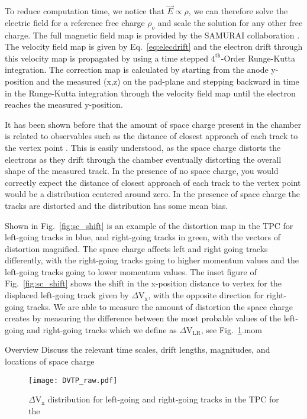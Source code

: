  To reduce computation time, we notice that $\vec{E}\propto \rho$, we can therefore solve the electric field for a reference free charge $\rho_o$ and scale the solution for any other free charge. The full magnetic field map is provided by the SAMURAI collaboration \cite{magnet}. The velocity field map is given by Eq.~\ref{eq:elecdrift} and the electron drift through this velocity map is propagated by using a time stepped $\mathrm{4}^{\mathrm{th}}$-Order Runge-Kutta integration. The correction map is calculated by starting from the anode y-position and the measured (x,z) on the pad-plane and stepping backward in time in the Runge-Kutta integration through the velocity field map until the electron reaches the measured y-position. 
 
 It has been shown before that the amount of space charge present in the chamber is related to observables such as the distance of closest approach of each track to the vertex point \cite{starSC}. This is easily understood, as the space charge distorts the electrons as they drift through the chamber eventually distorting the overall shape of the measured track. In the presence of no space charge, you would correctly expect the distance of closest approach of each track to the vertex point would be a distribution centered around zero. In the presence of space charge the tracks are distorted and the distribution has some mean bias. 

Shown in Fig.~\ref{fig:sc_shift} is an example of the distortion map in the TPC for left-going tracks in blue, and right-going tracks in green, with the vectors of distortion magnified. The space charge affects left and right going tracks differently, with the right-going tracks going to higher momentum values and the left-going tracks going to lower momentum values. The inset figure of Fig.~\ref{fig:sc_shift} shows the shift in the x-position distance to vertex for the displaced left-going track given by $\Delta\mathrm{V}_\mathrm{x}$, with the opposite direction for right-going tracks. We are able to measure the amount of distortion the space charge creates by measuring the difference between the most probable values of the left-going and right-going tracks which we define as $\Delta\mathrm{V}_\mathrm{LR}$, see Fig.~\ref{fig:VLR}.mom
 

Overview
Discuss the relevant time scales, drift lengths, magnitudes, and locations of space charge


\begin{figure}[H]
\texttt{[image: DVTP\_raw.pdf]}
\caption{$\Delta\mathrm{V}_\mathrm{x}$ distribution for left-going and right-going tracks in the TPC for the }
\label{fig:VLR}
\end{figure}


